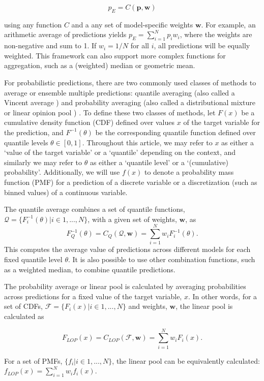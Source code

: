 \documentclass[
  article,
  shortnames,
  notitle]{jss}
\begin{document}
\[
p_E = C(\pmb{p}, \pmb{w}) 
\]

using any function \(C\) and a any set of model-specific weights
\(\pmb{w}\). For example, an arithmetic average of predictions yields
\(p_E = \sum_{i=1}^Np_iw_i\), where the weights are non-negative and sum
to 1. If \(w_i = 1/N\) for all \(i\), all predictions will be equally
weighted. This framework can also support more complex functions for
aggregation, such as a (weighted) median or geometric mean.

For probabilistic predictions, there are two commonly used classes of
methods to average or ensemble multiple predictions: quantile averaging
(also called a Vincent average \citep{vincent1912}) and probability
averaging (also called a distributional mixture or linear opinion pool
\citep{stone1961}) \citep{lichtendahl2013}. To define these two classes
of methods, let \(F(x)\) be a cumulative density function (CDF) defined
over values \(x\) of the target variable for the prediction, and
\(F^{-1}(\theta)\) be the corresponding quantile function defined over
quantile levels \(\theta \in [0, 1]\). Throughout this article, we may
refer to \(x\) as either a `value of the target variable' or a
`quantile' depending on the context, and similarly we may refer to
\(\theta\) as either a `quantile level' or a `(cumulative) probability'.
Additionally, we will use \(f(x)\) to denote a probability mass function
(PMF) for a prediction of a discrete variable or a discretization (such
as binned values) of a continuous variable.

The quantile average combines a set of quantile functions,
\(\mathcal{Q} = \{F_i^{-1}(\theta)| i \in 1,...,N \}\), with a given set
of weights, \(\pmb{w}\), as \[
F^{-1}_Q(\theta) = C_Q(\mathcal{Q}, \pmb{w}) = \sum_{i = 1}^Nw_iF^{-1}_i(\theta).
\]This computes the average value of predictions across different models
for each fixed quantile level \(\theta\). It is also possible to use
other combination functions, such as a weighted median, to combine
quantile predictions.

The probability average or linear pool is calculated by averaging
probabilities across predictions for a fixed value of the target
variable, \(x\). In other words, for a set of CDFs,
\(\mathcal{F} = \{F_i(x)| i \in 1,...,N \}\) and weights, \(\pmb{w}\),
the linear pool is calculated as

\[
F_{LOP}(x) = C_{LOP}(\mathcal{F}, \pmb{w}) = \sum_{i = 1}^Nw_iF_i(x). 
\]

For a set of PMFs, \(\{f_i|i \in 1, ..., N\}\), the linear pool can be
equivalently calculated: \(f_{LOP}(x) = \sum_{i = 1}^N w_i f_i(x)\).
\end{document}
